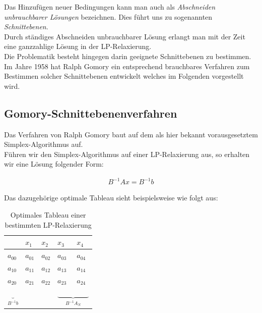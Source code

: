 \documentclass[tog]{acmsiggraph}
\begin{document}
Das Hinzufügen neuer Bedingungen kann man auch als \textit{Abschneiden unbrauchbarer Lösungen} bezeichnen. Dies führt uns zu sogenannten \textit{Schnittebenen}.\\
Durch ständiges Abschneiden unbrauchbarer Lösung erlangt man mit der Zeit eine ganzzahlige Lösung in der LP-Relaxierung.\\
Die Problematik besteht hingegen darin geeignete Schnittebenen zu bestimmen.\\
Im Jahre 1958 hat Ralph Gomory ein entsprechend brauchbares Verfahren zum Bestimmen solcher Schnittebenen entwickelt welches im Folgenden vorgestellt wird.

\subsection*{Gomory-Schnittebenenverfahren}

Das Verfahren von Ralph Gomory baut auf dem als hier bekannt vorausgesetztem Simplex-Algorithmus auf.\\
Führen wir den Simplex-Algorithmus auf einer LP-Relaxierung aus, so erhalten wir eine Lösung folgender Form:

\large
\begin{align}
\label{Eq:Simplex}
B^{-1} Ax = B^{-1}b
\end{align}
\normalsize

Das dazugehörige optimale Tableau sieht beispielsweise wie folgt aus:

\begin{table}[ht]
\centering
\caption{Optimales Tableau einer bestimmten LP-Relaxierung}
\label{Tb:Optimales Tableau}
\begin{tabular}{lllll}
& $x_1$ & $x_2$  & $x_3$ & $x_4$ \\
\hline
\multicolumn{1}{|l|}{\large$a_{00}$} & \large$a_{01}$  & \large$a_{02}$ & \large$a_{03}$ & \multicolumn{1}{l|}{\large$a_{04}$} \\ \hline
\multicolumn{1}{|l|}{\large$a_{10}$} & \large$a_{11}$ & \large$a_{12}$ & \large$a_{13}$ & \multicolumn{1}{l|}{\large$a_{14}$} \\
\multicolumn{1}{|l|}{\large$a_{20}$} & \large$a_{21}$ & \large$a_{22}$ & \large$a_{23}$ & \multicolumn{1}{l|}{\large$a_{24}$} \\ \hline               
\large$\underbrace{}_{B^{-1}b}$ &   &   & \multicolumn{2}{l}{\large$\underbrace{\;\;\;\;\;\;\;\;\;\;\;\;\;\;\;\;}_{B^{-1}A_N}$}      
\end{tabular}
\end{table}
\end{document}
